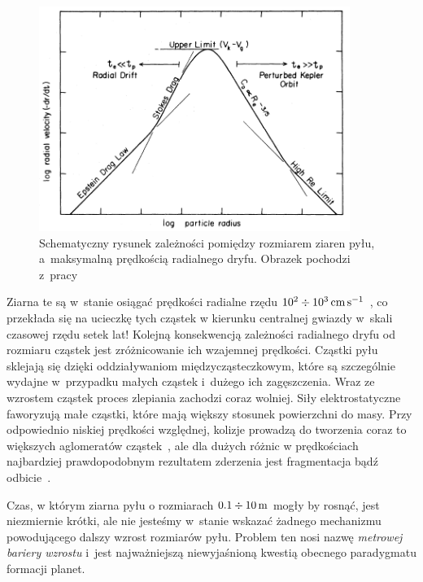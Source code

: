 \begin{figure}
   \includegraphics[width=0.9\textwidth]{figures/chap1_drift.png}
   \caption[Zależność pomiędzy rozmiarem pyłu, a maksymalną prędkością
   radialnego dryfu.]
   {Schematyczny rysunek zależności pomiędzy rozmiarem ziaren pyłu,
   a~maksymalną prędkością radialnego dryfu. Obrazek pochodzi
   z~pracy~\cite{W77}}
   \label{fig:chap1_drift}
\end{figure}

Ziarna te są w~stanie osiągać prędkości radialne rzędu
$10^2\div10^3\hbox{$\thinspace\textrm{cm}$}\hbox{$\thinspace\textrm{s}$}^{-1}$~\cite{W77}, co przekłada się na ucieczkę tych cząstek w
kierunku centralnej gwiazdy w~skali czasowej rzędu setek lat!  Kolejną
konsekwencją zależności radialnego dryfu od rozmiaru cząstek jest zróżnicowanie
ich wzajemnej prędkości. Cząstki pyłu sklejają się dzięki oddziaływaniom
międzycząsteczkowym, które są szczególnie wydajne w~przypadku małych cząstek
i~dużego ich zagęszczenia. Wraz ze wzrostem cząstek proces zlepiania zachodzi
coraz wolniej.  Siły elektrostatyczne faworyzują małe cząstki, które mają większy stosunek
powierzchni do masy. Przy odpowiednio niskiej prędkości względnej, kolizje
prowadzą do tworzenia coraz to większych aglomeratów cząstek~\citep{BW08}, ale
dla dużych różnic w prędkościach najbardziej prawdopodobnym rezultatem zderzenia
jest fragmentacja bądź odbicie~\citep{Z10}. 

\par Czas, w którym ziarna pyłu o rozmiarach $0.1 \div 10\hbox{$\thinspace\textrm{m}$}$ mogły
by rosnąć, jest niezmiernie krótki, ale nie jesteśmy w~stanie wskazać żadnego
mechanizmu powodującego dalszy wzrost rozmiarów pyłu. Problem ten nosi nazwę
\emph{metrowej bariery wzrostu} i~jest najważniejszą niewyjaśnioną kwestią
obecnego paradygmatu formacji planet. 

